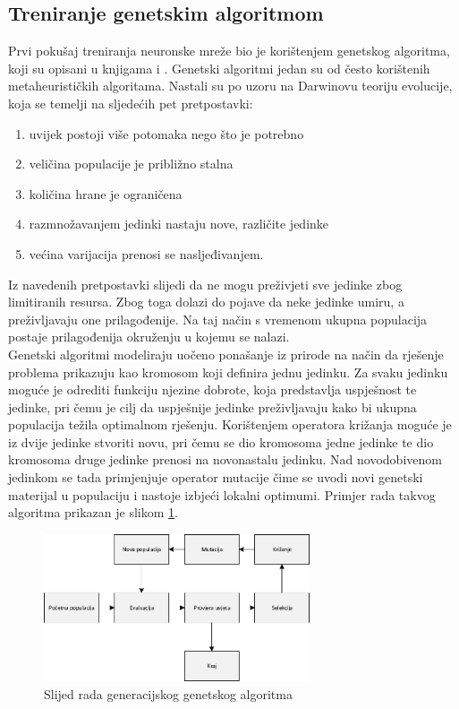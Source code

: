 \documentclass[times, utf8, zavrsni, numeric]{fer}
\begin{document}
\subsection{Treniranje genetskim algoritmom}
Prvi pokušaj treniranja neuronske mreže bio je korištenjem genetskog algoritma, koji su opisani u knjigama \cite{optjava} i \cite{GeneticAlgorithms}.
Genetski algoritmi jedan su od često korištenih metaheurističkih algoritama.
Nastali su po uzoru na Darwinovu teoriju evolucije, koja se temelji na sljedećih pet pretpostavki: 
\begin{enumerate}
\item uvijek postoji više potomaka nego što je potrebno
\item veličina populacije je približno stalna
\item količina hrane je ograničena
\item razmnožavanjem jedinki nastaju nove, različite jedinke
\item većina varijacija prenosi se nasljeđivanjem.
\end{enumerate}
Iz navedenih pretpostavki slijedi da ne mogu preživjeti sve jedinke zbog limitiranih resursa.
Zbog toga dolazi do pojave da neke jedinke umiru, a preživljavaju one prilagođenije.
Na taj način s vremenom ukupna populacija postaje prilagođenija okruženju u kojemu se nalazi.\\

Genetski algoritmi modeliraju uočeno ponašanje iz prirode na način da rješenje problema prikazuju kao kromosom koji definira jednu jedinku.
Za svaku jedinku moguće je odrediti funkciju njezine dobrote, koja predstavlja uspješnost te jedinke, pri čemu je cilj da uspješnije jedinke preživljavaju kako bi ukupna populacija težila optimalnom rješenju.
Korištenjem operatora križanja moguće je iz dvije jedinke stvoriti novu, pri čemu se dio kromosoma jedne jedinke te dio kromosoma druge jedinke prenosi na novonastalu jedinku.
Nad novodobivenom jedinkom se tada primjenjuje operator mutacije čime se uvodi novi genetski materijal u populaciju i nastoje izbjeći lokalni optimumi.
Primjer rada takvog algoritma prikazan je slikom \ref{fig:gen}.

\begin{figure}[ht!]
    \centering
    \includegraphics[width=0.7\textwidth]{Images/Gen.pdf}
    \captionsetup{justification=centering}
    \caption{Slijed rada generacijskog genetskog algoritma \cite{optjava}}
    \label{fig:gen}
\end{figure}
\end{document}
